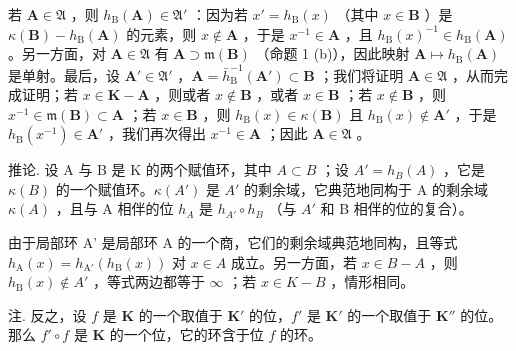 若 \(\mathbf{A} \in \mathfrak{A}\) ，则 \(h_{\mathrm{B}}(\mathbf{A}) \in \mathfrak{A}'\) ：因为若 \(x' = h_{\mathrm{B}}(x)\) （其中 \(x \in \mathbf{B}\) ）是 \(\kappa(\mathbf{B}) - h_{\mathrm{B}}(\mathbf{A})\) 的元素，则 \(x \notin \mathbf{A}\) ，于是 \(x^{-1} \in \mathbf{A}\) ，且 \(h_{\mathrm{B}}(x)^{-1} \in h_{\mathrm{B}}(\mathbf{A})\) 。另一方面，对 \(\mathbf{A} \in \mathfrak{A}\) 有 \(\mathbf{A} \supset \mathfrak{m}(\mathbf{B})\) （命题 1 (b)），因此映射 \(\mathbf{A} \mapsto h_{\mathrm{B}}(\mathbf{A})\) 是单射。最后，设 \(\mathbf{A}' \in \mathfrak{A}'\) ，\(\mathbf{A} = \bar{h}_{\mathrm{B}}^{-1}(\mathbf{A}') \subset \mathbf{B}\) ；我们将证明 \(\mathbf{A} \in \mathfrak{A}\) ，从而完成证明；若 \(x \in \mathbf{K} - \mathbf{A}\) ，则或者 \(x \notin \mathbf{B}\) ，或者 \(x \in \mathbf{B}\) ；若 \(x \notin \mathbf{B}\) ，则 \(x^{-1} \in \mathfrak{m}(\mathbf{B}) \subset \mathbf{A}\) ；若 \(x \in \mathbf{B}\) ，则 \(h_{\mathrm{B}}(x) \in \kappa(\mathbf{B})\) 且 \(h_{\mathrm{B}}(x) \notin \mathbf{A}'\) ，于是 \(h_{\mathrm{B}}(x^{-1}) \in \mathbf{A}'\) ，我们再次得出 \(x^{-1} \in \mathbf{A}\) ；因此 \(\mathbf{A} \in \mathfrak{A}\) 。

推论. 设 A 与 B 是 K 的两个赋值环，其中 \(A \subset B\) ；设 \(A' = h_{B}(A)\) ，它是 \(\kappa(B)\) 的一个赋值环。\(\kappa(A')\) 是 \(A'\) 的剩余域，它典范地同构于 A 的剩余域 \(\kappa(A)\) ，且与 A 相伴的位 \(h_{A}\) 是 \(h_{A'} \circ h_{B}\) （与 \(A'\) 和 B 相伴的位的复合）。

由于局部环 A' 是局部环 A 的一个商，它们的剩余域典范地同构，且等式 \(h_{\mathrm{A}}(x) = h_{\mathrm{A}'}(h_{\mathrm{B}}(x))\) 对 \(x \in A\) 成立。另一方面，若 \(x \in B - A\) ，则 \(h_{\mathrm{B}}(x) \notin A'\) ，等式两边都等于 \(\infty\) ；若 \(x \in K - B\) ，情形相同。

注. 反之，设 \(f\) 是 \(\mathbf{K}\) 的一个取值于 \(\mathbf{K}'\) 的位，\(f'\) 是 \(\mathbf{K}'\) 的一个取值于 \(\mathbf{K}''\) 的位。那么 \(f' \circ f\) 是 \(\mathbf{K}\) 的一个位，它的环含于位 \(f\) 的环。

